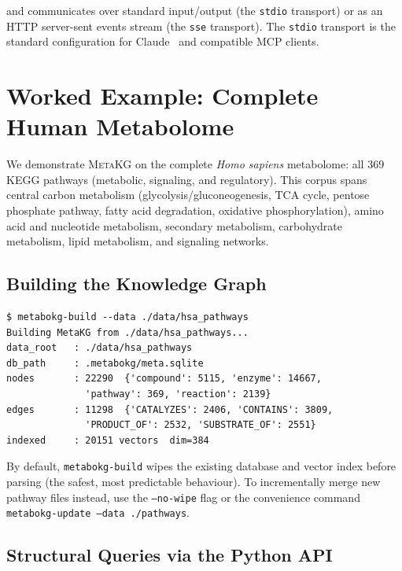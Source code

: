 \documentclass[10pt]{article}
\begin{document}
\noindent and communicates over standard input/output (the \texttt{stdio}
transport) or as an HTTP server-sent events stream (the \texttt{sse}
transport). The \texttt{stdio} transport is the standard configuration for
Claude~\citep{anthropic2024claude} and compatible MCP clients.

\section{Worked Example: Complete Human Metabolome}
\label{sec:usage}

We demonstrate \textsc{MetaKG} on the complete \textit{Homo sapiens}
metabolome: all 369 KEGG pathways (metabolic, signaling, and regulatory).
This corpus spans central carbon metabolism (glycolysis/gluconeogenesis, TCA
cycle, pentose phosphate pathway, fatty acid degradation, oxidative
phosphorylation), amino acid and nucleotide metabolism, secondary metabolism,
carbohydrate metabolism, lipid metabolism, and signaling networks.

\subsection{Building the Knowledge Graph}

\begin{lstlisting}[style=bash, caption={Building the complete human metabolome knowledge graph.}]
$ metabokg-build --data ./data/hsa_pathways
Building MetaKG from ./data/hsa_pathways...
data_root   : ./data/hsa_pathways
db_path     : .metabokg/meta.sqlite
nodes       : 22290  {'compound': 5115, 'enzyme': 14667,
              'pathway': 369, 'reaction': 2139}
edges       : 11298  {'CATALYZES': 2406, 'CONTAINS': 3809,
              'PRODUCT_OF': 2532, 'SUBSTRATE_OF': 2551}
indexed     : 20151 vectors  dim=384
\end{lstlisting}

By default, \texttt{metabokg-build} wipes the existing database and vector index
before parsing (the safest, most predictable behaviour). To incrementally merge
new pathway files instead, use the \texttt{--no-wipe} flag or the convenience
command \texttt{metabokg-update --data ./pathways}.

\subsection{Structural Queries via the Python API}
\end{document}

